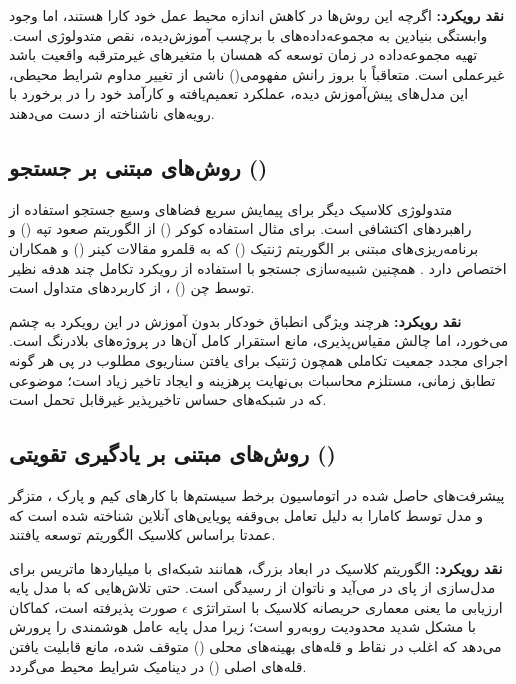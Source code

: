 \documentclass[oneside,openany,phd]{TMU-Thesis}
\begin{document}
\textbf{نقد رویکرد:} اگرچه این روش‌ها در کاهش اندازه محیط عمل خود کارا هستند، اما وجود وابستگی بنیادین به مجموعه‌داده‌های با برچسب آموزش‌دیده، نقص متدولوژی است. تهیه مجموعه‌داده در زمان توسعه که همسان با متغیرهای غیرمترقبه واقعیت باشد غیرعملی است. متعاقباً با بروز رانش مفهومی‌() ناشی از تغییر مداوم شرایط محیطی، این مدل‌های پیش‌آموزش دیده، عملکرد تعمیم‌یافته و کارآمد خود را در برخورد با رویه‌های ناشناخته از دست می‌دهند.

\subsection{روش‌های مبتنی بر جستجو ()}

متدولوژی کلاسیک دیگر برای پیمایش سریع فضاهای وسیع جستجو استفاده از راهبردهای اکتشافی است. برای مثال استفاده کوکر () از الگوریتم صعود تپه () \cite{coker2015sass} و برنامه‌ریزی‌های مبتنی بر الگوریتم ژنتیک () که به قلمرو مقالات کینر () و همکاران اختصاص دارد \cite{kinneer2018managing,kinneer2020building,kinneer2021information}. همچنین شبیه‌سازی جستجو با استفاده از رویکرد تکامل چند هدفه نظیر  توسط چن () \cite{chen2018femosaa}، از کاربردهای متداول است.

\textbf{نقد رویکرد:} هرچند ویژگی انطباق خودکار بدون آموزش در این رویکرد به چشم می‌خورد، اما چالش مقیاس‌پذیری، مانع استقرار کامل آن‌ها در پروژه‌های بلادرنگ است. اجرای مجدد جمعیت تکاملی همچون ژنتیک برای یافتن سناریوی مطلوب در پی هر گونه تطابق زمانی، مستلزم محاسبات بی‌نهایت پرهزینه و ایجاد تاخیر زیاد است؛ موضوعی که در شبکه‌های حساس تاخیرپذیر غیرقابل تحمل است.

\subsection{روش‌های مبتنی بر یادگیری تقویتی ()}

پیشرفت‌های حاصل شده در اتوماسیون برخط سیستم‌ها با کارهای کیم و پارک \cite{kim2009reinforcement}، متزگر \cite{metzger2022realizing} و مدل  توسط کامارا \cite{camara2020quantitative} به دلیل تعامل بی‌وقفه پویایی‌های آنلاین شناخته شده است که عمدتا براساس کلاسیک الگوریتم  توسعه یافتند.

\textbf{نقد رویکرد:} الگوریتم کلاسیک در ابعاد بزرگ، همانند شبکه‌ای با میلیاردها ماتریس برای مدل‌سازی از پای در می‌آید و ناتوان از رسیدگی است. حتی تلاش‌هایی که با مدل پایه ارزیابی ما یعنی معماری حریصانه کلاسیک  با استراتژی $\epsilon$ صورت پذیرفته است، کماکان با مشکل شدید محدودیت روبه‌رو است؛ زیرا مدل پایه عامل هوشمندی را پرورش می‌دهد که اغلب در نقاط و قله‌های بهینه‌های محلی () متوقف شده، مانع قابلیت یافتن قله‌های اصلی () در دینامیک شرایط محیط می‌گردد.
\end{document}
